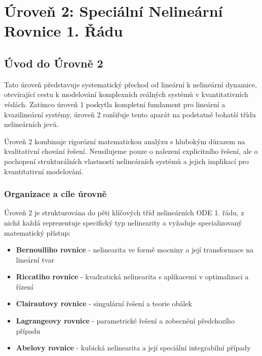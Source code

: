 \section{Úroveň 2: Speciální Nelineární Rovnice 1. Řádu}
\label{sec:level2}

\subsection{Úvod do Úrovně 2}
\label{subsec:uvod-uroven-2}

Tato úroveň představuje systematický přechod od lineární k nelineární dynamice, otevírající cestu k modelování komplexních reálných systémů v kvantitativních vědách. Zatímco úroveň 1 poskytla kompletní fundament pro lineární a kvazilineární systémy, úroveň 2 rozšiřuje tento aparát na podstatně bohatší třídu nelineárních jevů.

\vspace{0.8\baselineskip}

\begin{principle}
Úroveň 2 kombinuje rigorózní matematickou analýzu s hlubokým důrazem na kvalitativní chování řešení. Neusilujeme pouze o nalezení explicitního řešení, ale o pochopení strukturálních vlastností nelineárních systémů a jejich implikací pro kvantitativní modelování.
\end{principle}

\vspace{0.8\baselineskip}

\subsubsection*{Organizace a cíle úrovně}

Úroveň 2 je strukturována do pěti klíčových tříd nelineárních ODE 1. řádu, z nichž každá reprezentuje specifický typ nelinearity a vyžaduje specializovaný matematický přístup:

\begin{itemize}
\item \textbf{Bernoulliho rovnice} - nelinearita ve formě mocniny a její transformace na lineární tvar
\item \textbf{Riccatiho rovnice} - kvadratická nelinearita s aplikacemi v optimalizaci a řízení
\item \textbf{Clairautovy rovnice} - singulární řešení a teorie obálek
\item \textbf{Lagrangeovy rovnice} - parametrické řešení a zobecnění předchozího případu
\item \textbf{Abelovy rovnice} - kubická nelinearita a její speciální integrabilní případy
\end{itemize}


